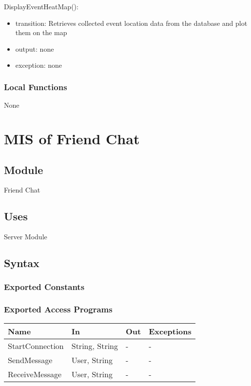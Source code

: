 \documentclass[12pt, titlepage]{article}
\begin{document}
\noindent DisplayEventHeatMap():
\begin{itemize}
\item transition: Retrieves collected event location data from the database and plot them on the map
\item output: none
\item exception: none
\end{itemize}

\subsubsection{Local Functions}

None

\newpage

\section{MIS of Friend Chat} \label{mFC}

\subsection{Module}

Friend Chat

\subsection{Uses}

Server Module

\subsection{Syntax}

\subsubsection{Exported Constants}

\subsubsection{Exported Access Programs}

\begin{center}
\begin{tabular}{p{4cm} p{3cm} p{3cm} p{4cm}}
\hline
\textbf{Name} & \textbf{In} & \textbf{Out} & \textbf{Exceptions} \\
\hline
StartConnection & String, String & - & - \\
SendMessage & User, String & - & - \\
ReceiveMessage & User, String & - & - \\

\hline
\end{tabular}
\end{center}
\end{document}

